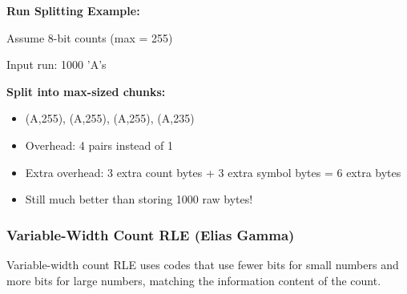 \begin{examplebox}
\textbf{Run Splitting Example:}

Assume 8-bit counts (max = 255)

Input run: 1000 'A's

\textbf{Split into max-sized chunks:}
\begin{itemize}
    \item (A,255), (A,255), (A,255), (A,235)
    \item Overhead: 4 pairs instead of 1
    \item Extra overhead: 3 extra count bytes + 3 extra symbol bytes = 6 extra bytes
    \item Still much better than storing 1000 raw bytes!
\end{itemize}
\end{examplebox}

\newpage
\subsubsection{Variable-Width Count RLE (Elias Gamma)}

Variable-width count RLE uses codes that use fewer bits for small numbers and more bits for large numbers, matching the information content of the count.

